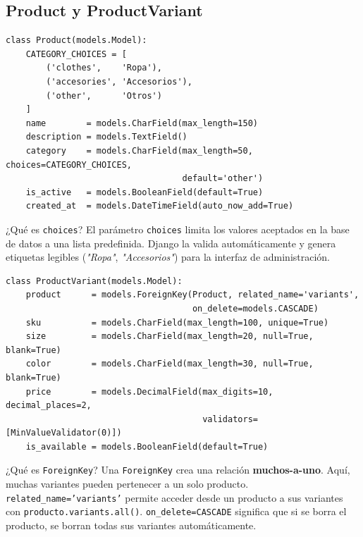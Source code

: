 \documentclass[12pt, a4paper]{article}
\begin{document}
\subsection{Product y ProductVariant}

\begin{lstlisting}[caption={products/models.py -- Producto y Variante}]
class Product(models.Model):
    CATEGORY_CHOICES = [
        ('clothes',    'Ropa'),
        ('accesories', 'Accesorios'),
        ('other',      'Otros')
    ]
    name        = models.CharField(max_length=150)
    description = models.TextField()
    category    = models.CharField(max_length=50, choices=CATEGORY_CHOICES,
                                   default='other')
    is_active   = models.BooleanField(default=True)
    created_at  = models.DateTimeField(auto_now_add=True)
\end{lstlisting}

\begin{conceptbox}{¿Qué es \texttt{choices}?}
El parámetro \texttt{choices} limita los valores aceptados en la base de datos a una
lista predefinida. Django la valida automáticamente y genera etiquetas legibles
(\textit{"Ropa"}, \textit{"Accesorios"}) para la interfaz de administración.
\end{conceptbox}

\begin{lstlisting}[caption={products/models.py -- ProductVariant}]
class ProductVariant(models.Model):
    product      = models.ForeignKey(Product, related_name='variants',
                                     on_delete=models.CASCADE)
    sku          = models.CharField(max_length=100, unique=True)
    size         = models.CharField(max_length=20, null=True, blank=True)
    color        = models.CharField(max_length=30, null=True, blank=True)
    price        = models.DecimalField(max_digits=10, decimal_places=2,
                                       validators=[MinValueValidator(0)])
    is_available = models.BooleanField(default=True)
\end{lstlisting}

\begin{conceptbox}{¿Qué es \texttt{ForeignKey}?}
Una \texttt{ForeignKey} crea una relación \textbf{muchos-a-uno}. Aquí, muchas variantes
pueden pertenecer a un solo producto. \texttt{related\_name='variants'} permite
acceder desde un producto a sus variantes con \texttt{producto.variants.all()}.
\texttt{on\_delete=CASCADE} significa que si se borra el producto, se borran todas
sus variantes automáticamente.
\end{conceptbox}
\end{document}
